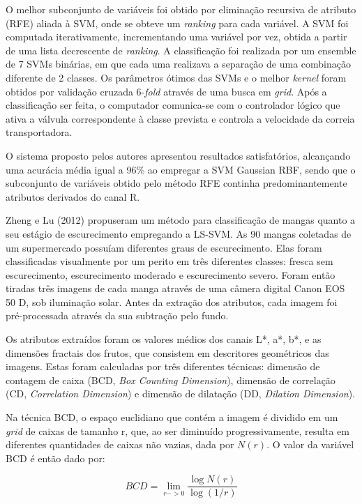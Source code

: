 O melhor subconjunto de variáveis foi obtido por eliminação recursiva de atributo (RFE) aliada à SVM, onde se obteve um \textit{ranking} para cada variável. A SVM foi computada iterativamente, incrementando uma variável por vez, obtida a partir de uma lista decrescente de \textit{ranking}. A classificação foi realizada por um ensemble de 7 SVMs binárias, em que cada uma realizava a separação de uma combinação diferente de 2 classes. Os parâmetros ótimos das SVMs e o melhor \textit{kernel} foram obtidos por validação cruzada 6-\textit{fold} através de uma busca em \textit{grid}. Após a classificação ser feita, o computador comunica-se com o controlador lógico que ativa a válvula correspondente à classe prevista e controla a velocidade da correia transportadora. 

O sistema proposto pelos autores apresentou resultados satisfatórios, alcançando uma acurácia média igual a 96\% ao empregar a SVM Gaussian RBF, sendo que o subconjunto de variáveis obtido pelo método RFE continha predominantemente atributos derivados do canal R.

Zheng e Lu (2012) propuseram um método para classificação de mangas quanto a seu estágio de escurecimento empregando a LS-SVM. As 90 mangas coletadas de um supermercado possuíam diferentes graus de escurecimento. Elas foram classificadas visualmente por um perito em três diferentes classes: fresca sem escurecimento, escurecimento moderado e escurecimento severo. Foram então tiradas três imagens de cada manga através de uma câmera digital Canon EOS 50 D, sob iluminação solar. Antes da extração dos atributos, cada imagem foi pré-processada através da sua subtração pelo fundo.

Os atributos extraídos foram os valores médios dos canais L*, a*, b*, e as dimensões fractais dos frutos, que consistem em descritores geométricos das imagens. Estas foram calculadas por três diferentes técnicas: dimensão de contagem de caixa (BCD, \textit{Box Counting Dimension}), dimensão de correlação (CD, \textit{Correlation Dimension}) e dimensão de dilatação (DD, \textit{Dilation Dimension}). 

Na técnica BCD, o espaço euclidiano que contém a imagem é dividido em um \textit{grid} de caixas de tamanho r, que, ao ser diminuído progressivamente, resulta em diferentes quantidades de caixas não vazias, dada por $N(r)$. O valor da variável BCD é então dado por:

\begin{equation} \label{eq:bcd}
	BCD = \lim_{r->0}\frac{\log{N(r)}}{\log{(1/r)}}
\end{equation}


